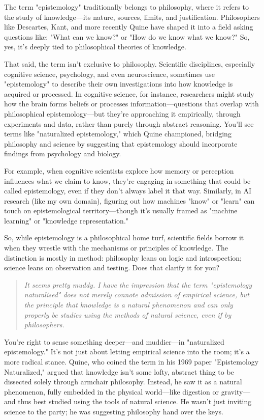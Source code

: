 \documentclass[10pt,titlepage]{book}
\begin{document}
The term "epistemology" traditionally belongs to philosophy, where it refers to the study of knowledge—its nature, sources, limits, and justification. Philosophers like Descartes, Kant, and more recently Quine have shaped it into a field asking questions like: "What can we know?" or "How do we know what we know?" So, yes, it’s deeply tied to philosophical theories of knowledge.

That said, the term isn’t exclusive to philosophy. Scientific disciplines, especially cognitive science, psychology, and even neuroscience, sometimes use "epistemology" to describe their own investigations into how knowledge is acquired or processed. In cognitive science, for instance, researchers might study how the brain forms beliefs or processes information—questions that overlap with philosophical epistemology—but they’re approaching it empirically, through experiments and data, rather than purely through abstract reasoning. You’ll see terms like "naturalized epistemology," which Quine championed, bridging philosophy and science by suggesting that epistemology should incorporate findings from psychology and biology.

For example, when cognitive scientists explore how memory or perception influences what we claim to know, they’re engaging in something that could be called epistemology, even if they don’t always label it that way. Similarly, in AI research (like my own domain), figuring out how machines "know" or "learn" can touch on epistemological territory—though it’s usually framed as "machine learning" or "knowledge representation."

So, while epistemology is a philosophical home turf, scientific fields borrow it when they wrestle with the mechanisms or principles of knowledge. The distinction is mostly in method: philosophy leans on logic and introspection; science leans on observation and testing. Does that clarify it for you?

\begin{quote}
  {\it It seems pretty muddy.  I have the impression that the term "epistemology naturalised" does not merely connote admission of empirical science, but the  principle that knowledge is a natural phenomenon and can only properly be studies using the methods of natural science, even if by philosophers.}
\end{quote}

You’re right to sense something deeper—and muddier—in "naturalized epistemology." It’s not just about letting empirical science into the room; it’s a more radical stance. Quine, who coined the term in his 1969 paper "Epistemology Naturalized," argued that knowledge isn’t some lofty, abstract thing to be dissected solely through armchair philosophy. Instead, he saw it as a natural phenomenon, fully embedded in the physical world—like digestion or gravity—and thus best studied using the tools of natural science. He wasn’t just inviting science to the party; he was suggesting philosophy hand over the keys.
\end{document}
